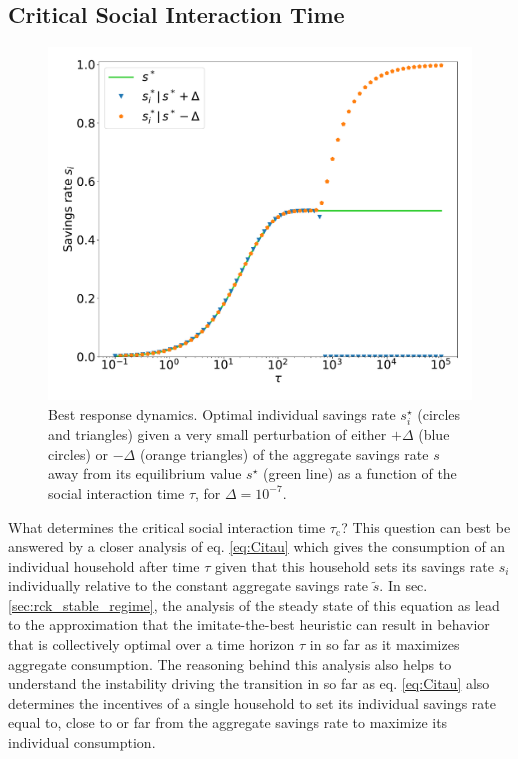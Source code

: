 \subsection{Critical Social Interaction Time}

\begin{figure}
  \centering
  \hspace{-1.5cm}\includegraphics[width = .7 \textwidth]{figures/best_response.pdf}
  \caption{Best response dynamics. Optimal individual savings rate $s_i^\star$ (circles and triangles) given a very small perturbation of either $+\Delta$ (blue circles) or $-\Delta$ (orange triangles) of the aggregate savings rate $s$ away from its equilibrium value $s^\star$ (green line) as a function of the social interaction time $\tau$, for $\Delta = 10^{-7}$.}\hspace{.5cm}
  \label{fig:best_response}
\end{figure}
What determines the critical social interaction time $\tau_\mathrm{c}$?
This question can best be answered by a closer analysis of eq. \eqref{eq:Citau} which gives the consumption of an individual household after time $\tau$ given that this household sets its savings rate $s_i$ individually relative to the constant aggregate savings rate $\tilde{s}$. 
In sec. \ref{sec:rck_stable_regime}, the analysis of the steady state of this equation as lead to the approximation that the imitate-the-best heuristic can result in behavior that is collectively optimal over a time horizon $\tau$ in so far as it maximizes aggregate consumption. 
The reasoning behind this analysis also helps to understand the instability driving the transition in so far as eq. \eqref{eq:Citau} also determines the incentives of a single household to set its individual savings rate equal to, close to or far from the aggregate savings rate to maximize its individual consumption. 
